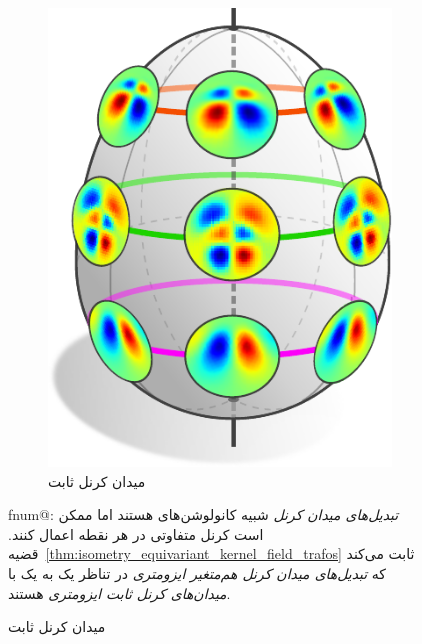 \begin{figure}
\begin{subfigure}[b]{0.24\textwidth}
		\includegraphics[width=.92\textwidth]{figures/isometry_egg_intro_antisymmetric.pdf}
		\vspace*{-.5ex}
		\captionsetup{format=hang, width=.8\textwidth}
		\caption{\small
			میدان کرنل ثابت 
		}
		\label{fig:isom_invariant_kernel_field_intro_O2}
	\end{subfigure}
	\hfill
	\begin{minipage}[b]{0.48\textwidth}
		\small %
		\makeatletter
		{\protect{}}%
		\csname fnum@\@captype\endcsname: %
		\makeatother
		\emph{تبدیل‌های میدان کرنل} شبیه کانولوشن‌های \lr{$\GM$} هستند اما ممکن است کرنل متفاوتی در هر نقطه اعمال کنند.
		قضیه~\ref{thm:isometry_equivariant_kernel_field_trafos} ثابت می‌کند که \emph{تبدیل‌های میدان کرنل هم‌متغیر ایزومتری} در تناظر یک به یک با \emph{میدان‌های کرنل ثابت ایزومتری} هستند.

\end{minipage}
\end{figure}
